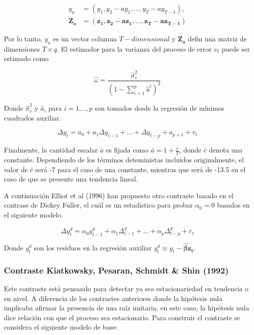 \documentclass[12pt, twoside]{book}\usepackage[]{graphicx}\usepackage[]{color}
\numberwithin{equation}{section}
\numberwithin{theorem}{section}
\numberwithin{teorema}{section}
\numberwithin{defi}{section}
\numberwithin{prop}{section}
\numberwithin{defi}{section}
\theoremstyle{plain}
\begin{document}
\begin{align}
y_{a} & = (y_{1}, y_{2}-a y_{1},...,y_{T}-ay_{T-1}), \\
\boldsymbol{Z_{a}} & = (\boldsymbol{z_{1},z_{2}-a z_{1},..., z_{T}-a z_{T-1}})
\end{align}

Por lo tanto, $y_{a}$ es un vector columna $T-dimensional$ y $\boldsymbol{Z_{a}}$ defin una matriz de dimensiones $T\times q$. El estimador para la varianza del proceso de error $v_{t}$ puede ser estimado como 

\begin{equation}
\hat{\omega} = \frac{\hat{\sigma}^{2}_{v}}{(1-\sum_{i=1}^{p}\hat{a}^{i})^{2}}
\end{equation}

Donde $\hat{\sigma}^{2}_{v}$ y $\hat{a}_{i}$ para $i=1,..,p$ son tomados desde la regresión de mínimos cuadrados auxiliar. 

\begin{equation}
\Delta y_{t} = a_{0}+a_{1}\Delta y_{t-1}+...+\Delta y_{t-p}+a_{p+1}+v_{t}
\end{equation}

Finalmente, la cantidad escalar $\bar{a}$ es fijada como $\bar{a}=1+\frac{\bar{c}}{T}$, donde $\bar{c}$ denota una constante. Dependiendo de los términos deteministas incluidos originalmente, el valor de $\bar{c}$ será -7 para el caso de una constante, mientras que será de -13.5 en el caso de que se presente una tendencia lineal. 

A continuación Elliot et al (1996) han propuesto otro contraste basado en el contrase de Dickey Fuller, el cuál es un estadístico para probar $\alpha_{0}=0$ basados en el siguiente modelo. 

\begin{equation}
\Delta y_{t}^{d} = \alpha_{0}y_{t-1}^{d}+\alpha_{1}\Delta _{t-1}^{d}+...+\alpha_{p}\Delta _{t-p}^{d}+\varepsilon_{t}
\end{equation}

Donde $y_{t}^{d}$ son los residuos en la regresión auxiliar $y_{t}^{d}\equiv y_{t}-\boldsymbol{\hat{\beta}z_{t}}.$  

\subsubsection{Contraste Kiatkowsky, Pesaran, Schmidt \& Shin (1992)}

Este contraste está pensando para detectar ya sea estacionariedad en tendencia o en nivel. A diferencia de los contrastes anteriores donde la hipótesis nula implicaba afirmar la presencia de una raíz unitaria, en este caso, la hipótesis nula dice relación con que el proceso sea estacionario. Para construir el contraste se considera el siguiente modelo de base: 
\end{document}
